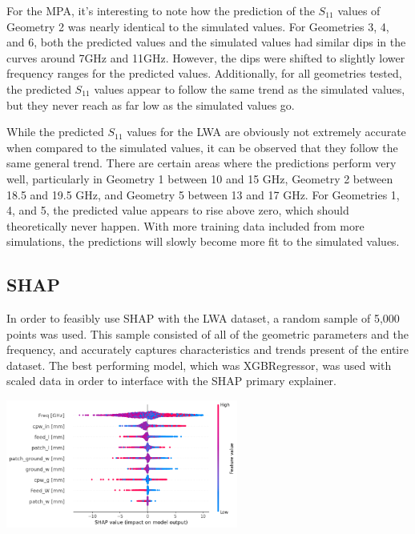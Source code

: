 \documentclass[conference]{IEEEtran}
\newenvironment{Figure}
    {\par\medskip\noindent\minipage{\linewidth}}
    {\endminipage\par\medskip}
\begin{document}
For the MPA, it's interesting to note how the prediction of the $S_{11}$ values of Geometry 2 was nearly identical to the simulated values. For Geometries 3, 4, and 6, both the predicted values and the simulated values had similar dips in the curves around 7GHz and 11GHz. However, the dips were shifted to slightly lower frequency ranges for the predicted values. Additionally, for all geometries tested, the predicted $S_{11}$ values appear to follow the same trend as the simulated values, but they never reach as far low as the simulated values go. 

While the predicted $S_{11}$ values for the LWA are obviously not extremely accurate when compared to the simulated values, it can be observed that they follow the same general trend. There are certain areas where the predictions perform very well, particularly in Geometry 1 between 10 and 15 GHz, Geometry 2 between 18.5 and 19.5 GHz, and Geometry 5 between 13 and 17 GHz. For Geometries 1, 4, and 5, the predicted value appears to rise above zero, which should theoretically never happen. With more training data included from more simulations, the predictions will slowly become more fit to the simulated values. 


\subsection{SHAP}
In order to feasibly use SHAP with the LWA dataset, a random sample of 5,000 points was used. This sample consisted of all of the geometric parameters and the frequency, and accurately captures characteristics and trends present of the entire dataset. The best performing model, which was XGBRegressor, was used with scaled data in order to interface with the SHAP primary explainer. 

    
\begin{Figure}
\centering
\includegraphics[width=3in]{shap_beeswarm}
\label{shap_beeswarm}
\end{Figure}
\end{document}
